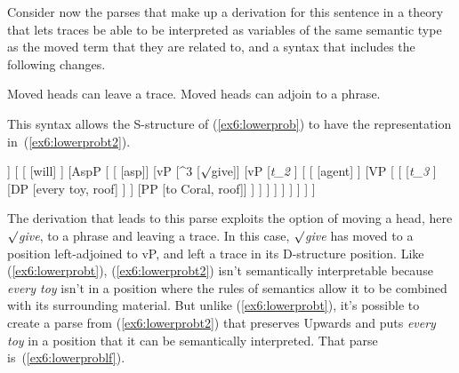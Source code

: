 Consider now the parses that make up a derivation for this sentence in a theory that lets traces be able to be interpreted as variables of the same semantic type as the moved term that they are related to, and a syntax that includes the following changes.
\begin{exe}
\raggedright
	\ex \label{ex6:newsyntax}
	\begin{xlist}
		\ex Moved heads can leave a trace.
		\ex Moved heads can adjoin to a phrase.
	\end{xlist}
\end{exe}
This syntax allows the S-structure of (\ref{ex6:lowerprob}) to have the representation in~(\ref{ex6:lowerprobt2}).
\begin{exe}
\raggedright
	\ex \label{ex6:lowerprobt2}
	\small
	\begin{forest}
	[TP
		[DP^2 [she, roof]]
		[
			[ [will] ]
				[AspP [ 
				[ [asp]]
					[vP
					[^3 [$\surd$give]]
					[vP 
					[\emph{t_2} ]
					[
						[ [agent] ]
						[VP [
							[
								[\emph{t_3} ]
								[DP [every toy, roof] ]
							 ]
							 [PP [to Coral, roof]]
						] ]
					]
				 ]
			 ]
		 ]
	]
	]
	]
	\end{forest}
\end{exe}
The derivation that leads to this parse exploits the option of moving a head, here $\surd$\emph{give}, to a phrase and leaving a trace. In this case, \emph{$\surd$give} has moved to a position left-adjoined to vP, and left a trace in its D-structure position. Like (\ref{ex6:lowerprobt}), (\ref{ex6:lowerprobt2}) isn't semantically interpretable because \emph{every toy} isn't in a position where the rules of semantics allow it to be combined with its surrounding material. But unlike (\ref{ex6:lowerprobt}), it's possible to create a parse from (\ref{ex6:lowerprobt2}) that preserves Upwards and puts \emph{every toy} in a position that it can be semantically interpreted. That parse is~(\ref{ex6:lowerproblf}).
\medskip
